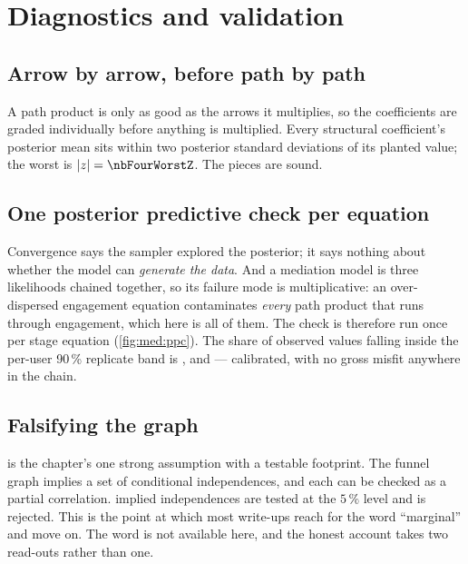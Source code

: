 

\section{Diagnostics and validation}
\label{sec:med:valid}

\subsection*{Arrow by arrow, before path by path}

A path product is only as good as the arrows it multiplies, so the coefficients are graded
individually before anything is multiplied. Every structural coefficient's posterior mean sits within
two posterior standard deviations of its planted value; the worst is
$|z| = \nbFourWorstZ$. The pieces are sound.

\subsection*{One posterior predictive check per equation}

Convergence says the sampler explored the posterior; it says nothing about whether the model can
\emph{generate the data}. And a mediation model is three likelihoods chained together, so its failure
mode is multiplicative: an over-dispersed engagement equation contaminates \emph{every} path product
that runs through engagement, which here is all of them. The check is therefore run once per stage
equation (\cref{fig:med:ppc}). The share of observed values falling inside the per-user 90\,\%
replicate band is \pc{\nbFourPpcEngagement}, \pc{\nbFourPpcActivated} and \pc{\nbFourPpcConverted}
--- calibrated, with no gross misfit anywhere in the chain.



\subsection*{Falsifying the graph}

 is the chapter's one strong assumption with a testable footprint. The funnel graph
implies a set of conditional independences, and each can be checked as a partial correlation.
\nbFourImpTests{} implied independences are tested at the $5\,\%$ level and \nbFourImpViolations{}
is rejected. This is the point at which most write-ups reach for the word ``marginal'' and move on.
The word is not available here, and the honest account takes two read-outs rather than one.

